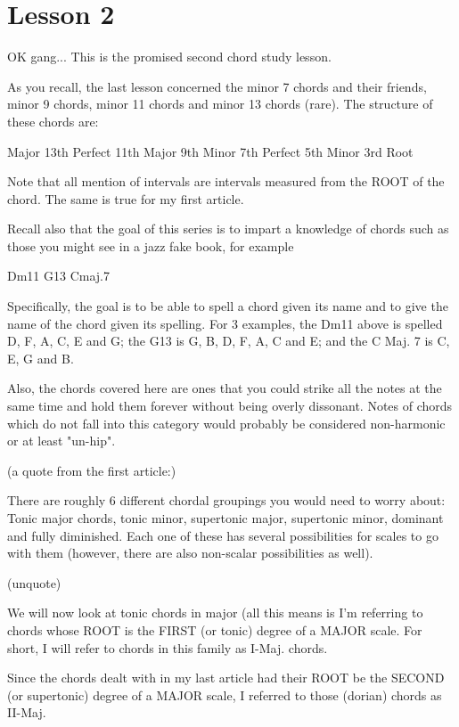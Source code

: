 \section{Lesson 2}

OK gang... This is the promised second chord study lesson.

As you recall, the last lesson concerned the minor 7 chords and their 
friends, minor 9 chords, minor 11 chords and minor 13 chords (rare).
The structure of these chords are:

        Major 13th
       Perfect 11th
        Major 9th
        Minor 7th
       Perfect 5th
        Minor 3rd
          Root

Note that all mention of intervals are intervals measured from the ROOT 
of the chord. The same is true for my first article.

Recall also that the goal of this series is to impart a knowledge of 
chords such as those you might see in a jazz fake book, for example

Dm11     G13     Cmaj.7

Specifically, the goal is to be able to spell a chord given its name and 
to give the name of the chord given its spelling. For 3 examples, the 
Dm11 above is spelled D, F, A, C, E and G; the G13 is G, B, D, F, A, C 
and E; and the C Maj. 7 is C, E, G and B.

Also, the chords covered here are ones that you could strike all the 
notes at the same time and hold them forever without being overly 
dissonant. Notes of chords which do not fall into this category would 
probably be considered non-harmonic or at least "un-hip".

(a quote from the first article:)

There are roughly 6 different chordal groupings you would need to worry about:
Tonic major chords, tonic minor, supertonic major, supertonic minor, dominant
and fully diminished. Each one of these has several possibilities for scales
to go with them (however, there are also non-scalar possibilities as well).

(unquote)

We will now look at tonic chords in major (all this means is I'm 
referring to chords whose ROOT is the FIRST (or tonic) degree of a MAJOR 
scale. For short, I will refer to chords in this family as I-Maj. chords. 

Since the chords dealt with in my last article had their ROOT be the SECOND 
(or supertonic) degree of a MAJOR scale, I referred to those (dorian) chords 
as II-Maj.

